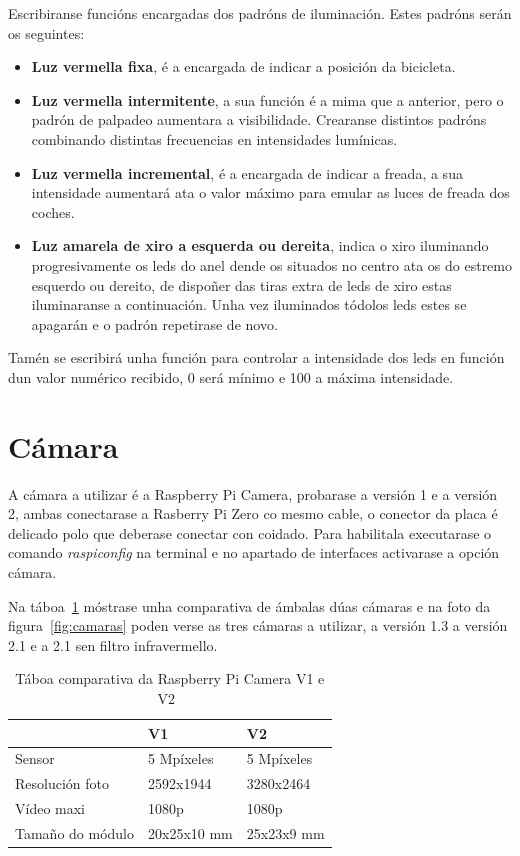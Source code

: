 Escribiranse funcións encargadas dos padróns de iluminación. Estes padróns serán os seguintes:
\begin{itemize}
    \item \textbf{Luz vermella fixa},
    é a encargada de indicar a posición da bicicleta.
    \item \textbf{Luz vermella intermitente},
    a sua función é a mima que a anterior, pero o padrón de palpadeo aumentara a visibilidade. Crearanse distintos padróns combinando distintas frecuencias en intensidades lumínicas.
    \item \textbf{Luz vermella incremental},
    é a encargada de indicar a freada, a sua intensidade aumentará ata o valor máximo para emular as luces de freada dos coches.
    \item \textbf{Luz amarela de xiro a esquerda ou dereita},
    indica o xiro iluminando progresivamente os leds do anel dende os situados no centro ata os do estremo esquerdo ou dereito, de dispoñer das tiras extra de leds de xiro estas iluminaranse a continuación. Unha vez iluminados tódolos leds estes se apagarán e o padrón repetirase de novo.
\end{itemize}

Tamén se escribirá unha función para controlar a intensidade dos leds en función dun valor numérico recibido, 0 será mínimo e 100 a máxima intensidade.

\section{Cámara}

A cámara a utilizar é a Raspberry Pi Camera, probarase a versión 1 e a versión 2, ambas conectarase a Rasberry Pi Zero co mesmo cable, o conector da placa é delicado polo que deberase conectar con coidado. Para habilitala executarase o comando \emph{raspiconfig} na terminal e no apartado de interfaces activarase a opción cámara.

 Na táboa~\ref{tab:comparativa_camaras} móstrase unha comparativa de ámbalas dúas cámaras e na foto da figura~\ref{fig:camaras} poden verse as tres cámaras a utilizar, a versión 1.3 a versión 2.1 e a 2.1 sen filtro infravermello.
\begin{table}[tb]
    \label{tab:comparativa_camaras}
    \caption{Táboa comparativa da Raspberry Pi Camera V1 e V2~\cite{mocqRaspberryPiPi2017}}
    \begin{center}
        \begin{tabular}{|l|l||l|}
            \hline
              &  V1 & V2\\ \hline
             Sensor  & 5 Mpíxeles & 5 Mpíxeles \\ \hline
             Resolución foto  & 2592x1944 & 3280x2464 \\ \hline
             Vídeo maxi & 1080p & 1080p \\ \hline
             Tamaño do módulo& 20x25x10 mm & 25x23x9 mm \\ \hline
        \end{tabular}
    \end{center}
\end{table}

